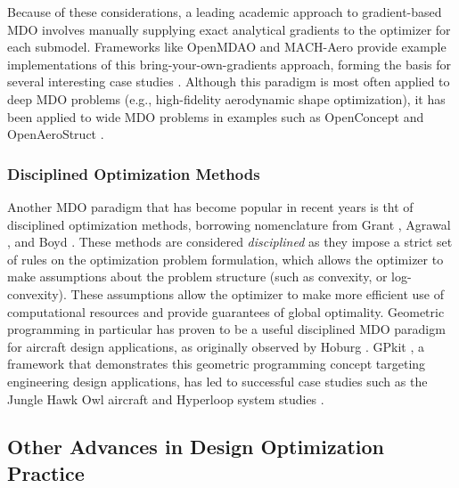 Because of these considerations, a leading academic approach to gradient-based MDO involves manually supplying exact analytical gradients to the optimizer for each submodel. Frameworks like OpenMDAO and MACH-Aero \cite{gray_openmdao_2019} provide example implementations of this bring-your-own-gradients approach, forming the basis for several interesting case studies \cite{yildirim_performance_2021, brelje_multidisciplinary_2021, openaerostruct, bons_highfidelity_2020}. Although this paradigm is most often applied to deep MDO problems (e.g., high-fidelity aerodynamic shape optimization), it has been applied to wide MDO problems in examples such as OpenConcept \cite{brelje_multidisciplinary_2021} and OpenAeroStruct \cite{openaerostruct}.

\subsubsection{Disciplined Optimization Methods}

Another MDO paradigm that has become popular in recent years is tht of disciplined optimization methods, borrowing nomenclature from Grant \cite{grant_disciplined_2006}, Agrawal \cite{agrawal_disciplined_2019}, and Boyd \cite{boyd_tutorial_2007, boyd_convex_2004}. These methods are considered \textit{disciplined} as they impose a strict set of rules on the optimization problem formulation, which allows the optimizer to make assumptions about the problem structure (such as convexity, or log-convexity). These assumptions allow the optimizer to make more efficient use of computational resources and provide guarantees of global optimality. Geometric programming in particular has proven to be a useful disciplined MDO paradigm for aircraft design applications, as originally observed by Hoburg \cite{hoburg_geometric_2014}. GPkit \cite{gpkit, hoburg_geometric_2014, kirschen}, a framework that demonstrates this geometric programming concept targeting engineering design applications, has led to successful case studies such as the Jungle Hawk Owl aircraft \cite{jho} and Hyperloop system studies \cite{gpkit}.

\subsection{Other Advances in Design Optimization Practice}


